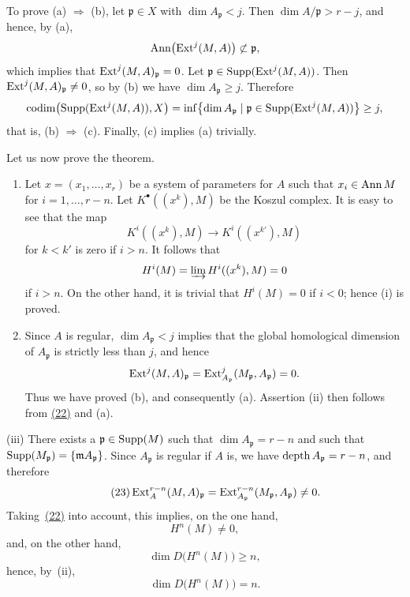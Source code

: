 To prove \textup{(a)} $\Longrightarrow$ \textup{(b)}, let
$\mathfrak p\in X$ with $\dim A_{\mathfrak p}<j$. Then
$\dim A/\mathfrak p>r-j$, and hence, by \textup{(a)},
\[
  \operatorname{Ann}\bigl(\operatorname{Ext}^j(M,A)\bigr)\not\subset\mathfrak p,
\]
which implies that $\operatorname{Ext}^j(M,A)_{\mathfrak p}=0$. Let
$\mathfrak p\in\operatorname{Supp}(\operatorname{Ext}^j(M,A))$. Then
$\operatorname{Ext}^j(M,A)_{\mathfrak p}\neq0$, so by \textup{(b)} we have
$\dim A_{\mathfrak p}\geq j$. Therefore
\[
  \operatorname{codim}\bigl(\operatorname{Supp}(\operatorname{Ext}^j(M,A)),X\bigr)
  =\inf\bigl\{\dim A_{\mathfrak p}\mid
  \mathfrak p\in\operatorname{Supp}(\operatorname{Ext}^j(M,A))\bigr\}\geq j,
\]
that is, \textup{(b)} $\Longrightarrow$ \textup{(c)}. Finally,
\textup{(c)} implies \textup{(a)} trivially.

\noindent{}Let us now prove the theorem.
\begin{enumerate}
\item[(i)]
Let $x=(x_1,\dots,x_r)$ be a system of parameters for $A$ such that
$x_i\in\operatorname{Ann} M$ for $i=1,\dots,r-n$. Let
$K^\bullet((x^k),M)$ be the Koszul complex. It is easy to see that the map
\[
  K^i((x^k),M)\longrightarrow K^i((x^{k'}),M)
\]
for $k<k'$ is zero if $i>n$. It follows that
\[
  H^i(M)=\varinjlim H^i((x^k),M)=0
\]
if $i>n$. On the other hand, it is trivial that $H^i(M)=0$ if $i<0$;
hence \textup{(i)} is proved.

\item[(ii)]
Since $A$ is regular, $\dim A_{\mathfrak p}<j$ implies that the global
homological dimension of $A_{\mathfrak p}$ is strictly less than $j$, and
hence
\[
  \operatorname{Ext}^j(M,A)_{\mathfrak p}
  =\operatorname{Ext}^j_{A_{\mathfrak p}}(M_{\mathfrak p},A_{\mathfrak p})=0.
\]
Thus we have proved \textup{(b)}, and consequently \textup{(a)}.
Assertion \textup{(ii)} then follows from \textup{\hyperref[eq:V.22]{(22)}} and
\textup{(a)}.
\end{enumerate}

\medskip
\noindent\textup{(iii)} There exists a
$\mathfrak p\in\operatorname{Supp}(M)$ such that $\dim A_{\mathfrak p}=r-n$ and such that
$\operatorname{Supp}(M_{\mathfrak p})=\{\mathfrak m A_{\mathfrak p}\}$. Since
$A_{\mathfrak p}$ is regular if $A$ is, we have
$\operatorname{depth} A_{\mathfrak p}=r-n$, and therefore
\begin{equation}\tag{23}\label{eq:V.23}
  \operatorname{Ext}_A^{r-n}(M,A)_{\mathfrak p}
  =\operatorname{Ext}_{A_{\mathfrak p}}^{r-n}(M_{\mathfrak p},A_{\mathfrak p})\neq 0.
\end{equation}
Taking~\textup{\hyperref[eq:V.22]{(22)}} into account, this implies, on the one hand,
\[
  H^n(M)\neq 0,
\]
and, on the other hand,
\[
  \dim D\bigl(H^n(M)\bigr)\geq n,
\]
hence, by~\textup{(ii)},
\[
  \dim D\bigl(H^n(M)\bigr)=n.
\]

